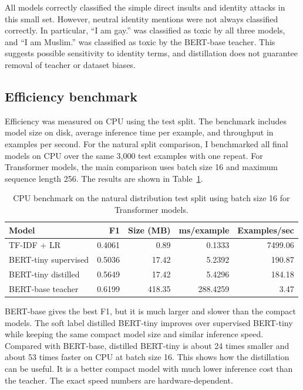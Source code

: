 \documentclass[pdflatex,sn-mathphys-num]{sn-jnl}
\begin{document}
All models correctly classified the simple direct insults and identity attacks in this small set.
However, neutral identity mentions were not always classified correctly.
In particular, ``I am gay.'' was classified as toxic by all three models, and ``I am Muslim.'' was classified as toxic by the BERT-base teacher.
This suggests possible sensitivity to identity terms, and distillation does not guarantee removal of teacher or dataset biases.

\subsection{Efficiency benchmark}

Efficiency was measured on CPU using the test split.
The benchmark includes model size on disk, average inference time per example, and throughput in examples per second.
For the natural split comparison, I benchmarked all final models on CPU over the same 3,000 test examples with one repeat.
For Transformer models, the main comparison uses batch size 16 and maximum sequence length 256.
The results are shown in Table~\ref{tab:september-cpu-benchmark}.

\begin{table}[htbp]
\caption{CPU benchmark on the natural distribution test split using batch size 16 for Transformer models.}
\label{tab:september-cpu-benchmark}
\centering
\scriptsize
\begin{tabular}{lrrrr}
\toprule
Model & F1 & Size (MB) & ms/example & Examples/sec \\
\midrule
TF-IDF + LR & 0.4061 & 0.89 & 0.1333 & 7499.06 \\
BERT-tiny supervised & 0.5036 & 17.42 & 5.2392 & 190.87 \\
BERT-tiny distilled & 0.5649 & 17.42 & 5.4296 & 184.18 \\
BERT-base teacher & 0.6199 & 418.35 & 288.4259 & 3.47 \\
\bottomrule
\end{tabular}
\end{table}

BERT-base gives the best F1, but it is much larger and slower than the compact models.
The soft label distilled BERT-tiny improves over supervised BERT-tiny while keeping the same compact model size and similar inference speed.
Compared with BERT-base, distilled BERT-tiny is about 24 times smaller and about 53 times faster on CPU at batch size 16.
This shows how the distillation can be useful.
It is a better compact model with much lower inference cost than the teacher.
The exact speed numbers are hardware-dependent.
\end{document}
